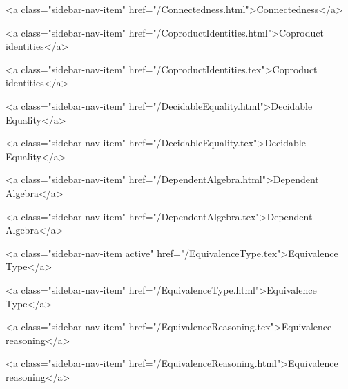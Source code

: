       
    
      
        
          <a class="sidebar-nav-item" href="/Connectedness.html">Connectedness</a>
        
      
    
      
        
          <a class="sidebar-nav-item" href="/CoproductIdentities.html">Coproduct identities</a>
        
      
    
      
        
          <a class="sidebar-nav-item" href="/CoproductIdentities.tex">Coproduct identities</a>
        
      
    
      
        
          <a class="sidebar-nav-item" href="/DecidableEquality.html">Decidable Equality</a>
        
      
    
      
        
          <a class="sidebar-nav-item" href="/DecidableEquality.tex">Decidable Equality</a>
        
      
    
      
        
          <a class="sidebar-nav-item" href="/DependentAlgebra.html">Dependent Algebra</a>
        
      
    
      
        
          <a class="sidebar-nav-item" href="/DependentAlgebra.tex">Dependent Algebra</a>
        
      
    
      
        
          <a class="sidebar-nav-item active" href="/EquivalenceType.tex">Equivalence Type</a>
        
      
    
      
        
          <a class="sidebar-nav-item" href="/EquivalenceType.html">Equivalence Type</a>
        
      
    
      
        
          <a class="sidebar-nav-item" href="/EquivalenceReasoning.tex">Equivalence reasoning</a>
        
      
    
      
        
          <a class="sidebar-nav-item" href="/EquivalenceReasoning.html">Equivalence reasoning</a>
        
